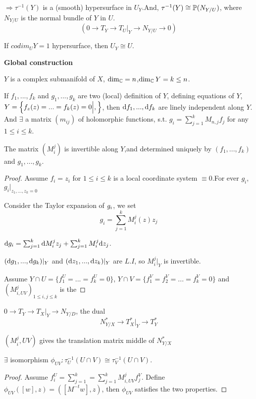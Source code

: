 $\Rightarrow\tau^{-1}(Y)$ is a (smooth) hypersurface in $U_Y$.And,
$\tau^{-1}(Y)\cong \mathbb{P}(N_{Y/U})$,
where $N_{Y/U}$ is the normal bundle of $Y$ in $U$.
$$(0\to T_Y\to T_U|_Y\to N_{Y/U}\to 0)$$

If $codim_UY=1$ hypersurface, then $U_Y\cong U$.

\textbf{Global construction}

$Y$ is a complex submanifold of $X$, $\dim_{\mathbb{C}}=n$,$\dim_{\mathbb{C}}Y=k\leq n$.

\begin{lemma}
  If $f_1,...,f_k$ and $g_1,...,g_k$ are two (local) definition of $Y$,
defining equations of $Y$, $Y=\Big\{ f_z(z)=...=f_k(z)=0 \Big| , \Big\}$,
then $\mathrm{d} f_1,...,\mathrm{d} f_k$ are linely independent along $Y$.
And $\exists$ a matrix $(m_{ij})$ of holomorphic functions,
s.t. $g_i=\sum_{j=1}^{k}M_{n,j}f_j$ for any $1\leq i\leq k$.

The matrix $(M_i^j)$ is invertible along $Y$,and determined uniquely
by $(f_1,...,f_k)$ and $g_1,...,g_k$.
\end{lemma}

\begin{proof}
Assume $f_i=z_i$ for $1\leq i\leq k$ is a local coordinate system
$\equiv 0$.For ever $g_i$, $g_i|_{z_1,...,z_k=0}$

Consider the Taylor expansion of $\\g_i$, we set
$$g_i=\sum_{j=1}^kM_i^j(z)z_j$$

$\mathrm{d} g_i=\sum_{j=1}^{k}\mathrm{d} M_{i}^jz_j+
\sum_{j=1}^{k} M_i^j\mathrm{d} z_j$.

$(\mathrm{d} g_1,...,\mathrm{d} g_k)|_{Y}$
and $(\mathrm{d} z_1,...,\mathrm{d} z_k)|_Y$ are $L.I$,
so $M_i^j|_{Y}$ is invertible.

Assume $Y\cap U=\{f_1^U=...=f_k^{U}=0\}$,
$Y\cap V=\{f_1^V=f_2^V=...=f_k^V=0\}$ and
$(M_{i,UV}^j)_{1\leq i,j\leq k}$ is the
\end{proof}

$0\to T_Y\to T_X|_Y\to N_{Y/D}$, the dual
$$N^*_{Y/ X}\to T_X^*|_Y\to T^*_Y$$

$(M_i^j,UV)$ gives the translation matrix middle of $N_{Y/X}^*$

\begin{lemma} $\exists$ isomorphism $\phi_{UV}:
\tau_U^{-1}(U\cap V)\cong \tau_V^{-1}(U\cap V)$.
\end{lemma}

\begin{proof}
  Assume $f_i^U=\sum_{j=1}^{k}=\sum_{j=1}^{k}M_{i,UV}^jf_j^V$.
Define $\phi_{UV}([w],z)=([M^{-t}w],z)$, then
$\phi_{UV}$ satisfies the two properties.
\end{proof}

